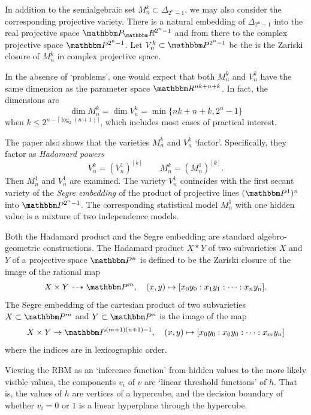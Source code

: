 \documentclass[11pt,titlepage]{article}
\begin{document}
    In addition to the semialgebraic set $M_n^k \subset \Delta_{2^n - 1}$, we
    may also consider the corresponding projective variety.  There is a natural
    embedding of $\Delta_{2^n-1}$ into the real projective space
    $\Proj_\R^{2^n-1}$ and from there to the complex projective space
    $\Proj^{2^n-1}$.  Let $V_n^k \subset \Proj^{2^n-1}$ be the is the Zariski
    closure of $M_n^k$ in complex projective space.

    In the absence of `problems', one would expect that both $M_n^k$ and $V_n^k$
    have the same dimension as the parameter space $\R^{nk + n + k}$.  In fact,
    the dimensions are
    \[
        \dim M_n^k = \dim V_n^k = \min\{nk+n+k, 2^n -1\}
    \]
    when $k \le 2^{n - \lceil \log_2(n+1) \rceil}$, which includes most cases of
    practical interest.

    The paper \cite{CMS09} also shows that the varieties $M_n^k$ and $V_n^k$
    `factor'.  Specifically, they factor as \emph{Hadamard powers}
    \[
        V_n^k = (V_n^1)^{[k]}
        \qquad
        M_n^k = (M_n^1)^{[k]}.
    \]
    Then $M_n^1$ and $V_n^1$ are examined.  The variety $V_n^1$ conincides with
    the first secant variety of the \emph{Segre embedding} of the product of
    projective lines $(\Proj^1)^n$ into $\Proj^{2^n-1}$.  The corresponding
    statistical model $M_n^1$ with one hidden value is a mixture of two
    independence models.

    Both the Hadamard product and the Segre embedding are standard
    algebro-geometric constructions.  The Hadamard product $X * Y$ of two
    subvarieties $X$ and $Y$ of a projective space $\Proj^n$ is defined to be
    the Zariski closure of the image of the rational map
    \[
        X \times Y \dashrightarrow \Proj^m,
        \quad
        (x, y) \mapsto [x_0y_0: x_1y_1 : \cdots : x_n y_n].
    \]
    The Segre embedding of the cartesian product of two subvarieties $X \subset
    \Proj^m$ and $Y \subset \Proj^n$ is the image of the map
    \[
        X \times Y \to \Proj^{(m+1)(n+1) - 1},
        \quad
        (x, y) \mapsto
        [x_0y_0: x_0 y_0 : \cdots : x_my_n]
    \]
    where the indices are in lexicographic order.

    Viewing the RBM as an `inference function' from hidden values to the more
    likely visible values, the components $v_i$ of $v$ are
    `linear threshold functions' of $h$.  That is, the values of $h$ are
    vertices of a hypercube, and the decision boundary of whether $v_i = 0$ or
    $1$ is a linear hyperplane through the hypercube.
\end{document}
